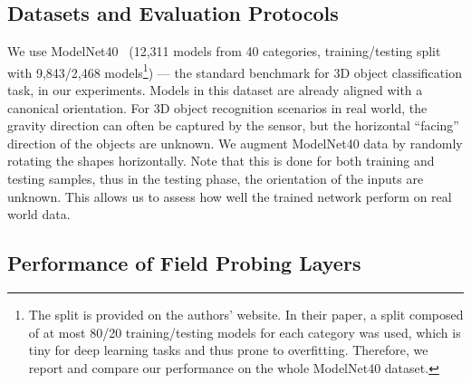 \vspace{-0.2cm}
\subsection{Datasets and Evaluation Protocols}
We use ModelNet40~\cite{WU_CVPR15_3D} (12,311 models from 40 categories, training/testing split with 9,843/2,468 models\footnote{The split is provided on the authors' website. In their paper, a split composed of at most 80/20 training/testing models for each category was used, which is tiny for deep learning tasks and thus prone to overfitting. Therefore, we report and compare our performance on the whole ModelNet40 dataset.}) --- the standard benchmark for 3D object classification task, in our experiments. Models in this dataset are already aligned with a canonical orientation. For 3D object recognition scenarios in real world, the gravity direction can often be captured by the sensor, but the horizontal ``facing'' direction of the objects are unknown. We augment ModelNet40 data by randomly rotating the shapes horizontally. Note that this is done for both training and testing samples, thus in the testing phase, the orientation of the inputs are unknown. This allows us to assess how well the trained network perform on real world data.

\subsection{Performance of Field Probing Layers}

\begin{table}
	\vspace{-2.1cm}
	\begin{center}
	\end{center}
	\vspace{-0.2cm}
	\caption{Top-1 accuracy of FPNNs on 3D object classification task on $ModelNet40$ dataset.}
	\label{tab:performance_evaluation}
	\vspace{-0.2cm}
\end{table}

